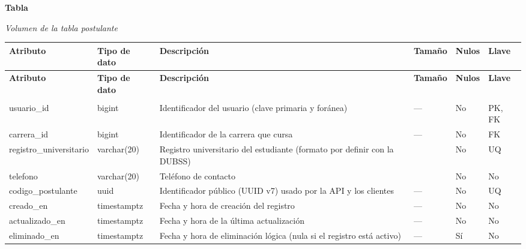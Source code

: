 \label{tab:volumen_postulante}
\noindent\textbf{Tabla~\thetable}\par\nopagebreak
\noindent\textit{Volumen de la tabla postulante}\par\nopagebreak
\begingroup\small\linespread{1}\selectfont\setlength{\tabcolsep}{4pt}
\begin{longtable}{>{\raggedright\arraybackslash}p{3.4cm} >{\raggedright\arraybackslash}p{2.5cm} >{\raggedright\arraybackslash}p{4.8cm} >{\centering\arraybackslash}p{1.6cm}>{\centering\arraybackslash}p{1.1cm} >{\centering\arraybackslash}p{1.3cm}}
\toprule
\textbf{Atributo} & \textbf{Tipo de dato} & \textbf{Descripción} & \textbf{Tamaño} & \textbf{Nulos} & \textbf{Llave} \\
\midrule
\endfirsthead
\toprule
\textbf{Atributo} & \textbf{Tipo de dato} & \textbf{Descripción} & \textbf{Tamaño} & \textbf{Nulos} & \textbf{Llave} \\
\midrule
\endhead
\endfoot
\bottomrule
\multicolumn{6}{l}{\textit{Nota.} Elaboración propia.} \\
\endlastfoot
usuario\_\allowbreak{}id & bigint & Identificador del usuario (clave primaria y foránea) & — & No & PK, FK \\
carrera\_\allowbreak{}id & bigint & Identificador de la carrera que cursa & — & No & FK \\
registro\_\allowbreak{}universitario & varchar(20) & Registro universitario del estudiante (formato por definir con la DUBSS) & 20 & No & UQ \\
telefono & varchar(20) & Teléfono de contacto & 20 & No & No \\
codigo\_\allowbreak{}postulante & uuid & Identificador público (UUID v7) usado por la API y los clientes & — & No & UQ \\
creado\_\allowbreak{}en & timestamptz & Fecha y hora de creación del registro & — & No & No \\
actualizado\_\allowbreak{}en & timestamptz & Fecha y hora de la última actualización & — & No & No \\
eliminado\_\allowbreak{}en & timestamptz & Fecha y hora de eliminación lógica (nula si el registro está activo) & — & Sí & No \\
\end{longtable}
\endgroup
\addtocounter{table}{-1}

